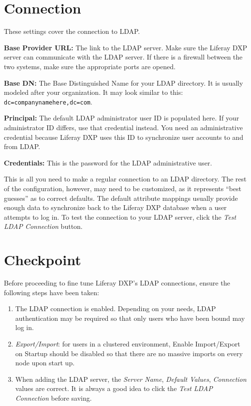 \section{Connection}\label{connection}

These settings cover the connection to LDAP.

\textbf{Base Provider URL:} The link to the LDAP server. Make sure the
Liferay DXP server can communicate with the LDAP server. If there is a
firewall between the two systems, make sure the appropriate ports are
opened.

\textbf{Base DN:} The Base Distinguished Name for your LDAP directory.
It is usually modeled after your organization. It may look similar to
this: \texttt{dc=companynamehere,dc=com}.

\textbf{Principal:} The default LDAP administrator user ID is populated
here. If your administrator ID differs, use that credential instead. You
need an administrative credential because Liferay DXP uses this ID to
synchronize user accounts to and from LDAP.

\textbf{Credentials:} This is the password for the LDAP administrative
user.

This is all you need to make a regular connection to an LDAP directory.
The rest of the configuration, however, may need to be customized, as it
represents ``best guesses'' as to correct defaults. The default
attribute mappings usually provide enough data to synchronize back to
the Liferay DXP database when a user attempts to log in. To test the
connection to your LDAP server, click the \emph{Test LDAP Connection}
button.

\section{Checkpoint}\label{checkpoint-1}

Before proceeding to fine tune Liferay DXP's LDAP connections, ensure
the following steps have been taken:

\begin{enumerate}
\def\labelenumi{\arabic{enumi}.}
\item
  The LDAP connection is enabled. Depending on your needs, LDAP
  authentication may be required so that only users who have been bound
  may log in.
\item
  \emph{Export/Import}: for users in a clustered environment, Enable
  Import/Export on Startup should be disabled so that there are no
  massive imports on every node upon start up.
\item
  When adding the LDAP server, the \emph{Server Name}, \emph{Default
  Values}, \emph{Connection} values are correct. It is always a good
  idea to click the \emph{Test LDAP Connection} before saving.
\end{enumerate}

